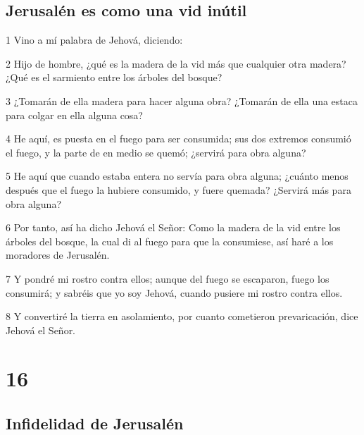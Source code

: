 \section*{Jerusalén es como una vid inútil}

\par 1 Vino a mí palabra de Jehová, diciendo:
\par 2 Hijo de hombre, ¿qué es la madera de la vid más que cualquier otra madera? ¿Qué es el sarmiento entre los árboles del bosque?
\par 3 ¿Tomarán de ella madera para hacer alguna obra? ¿Tomarán de ella una estaca para colgar en ella alguna cosa?
\par 4 He aquí, es puesta en el fuego para ser consumida; sus dos extremos consumió el fuego, y la parte de en medio se quemó; ¿servirá para obra alguna?
\par 5 He aquí que cuando estaba entera no servía para obra alguna; ¿cuánto menos después que el fuego la hubiere consumido, y fuere quemada? ¿Servirá más para obra alguna?
\par 6 Por tanto, así ha dicho Jehová el Señor: Como la madera de la vid entre los árboles del bosque, la cual di al fuego para que la consumiese, así haré a los moradores de Jerusalén.
\par 7 Y pondré mi rostro contra ellos; aunque del fuego se escaparon, fuego los consumirá; y sabréis que yo soy Jehová, cuando pusiere mi rostro contra ellos.
\par 8 Y convertiré la tierra en asolamiento, por cuanto cometieron prevaricación, dice Jehová el Señor.

\chapter{16}

\section*{Infidelidad de Jerusalén}

